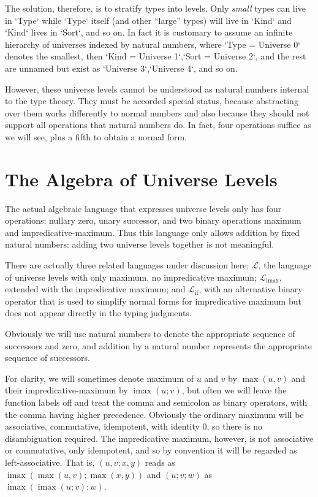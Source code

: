 \documentclass[11pt, twoside, reqno]{book}
\DeclareMathOperator{\imax}{imax}
\DeclareMathOperator{\ifop}{if}
\begin{document}
The solution, therefore, is to stratify types into levels.
Only \emph{small} types can live in \inHS`Type` while \inHS`Type` itself (and other ``large'' types) will live in \inHS`Kind` and \inHS`Kind` lives in \inHS`Sort`, and so on.
In fact it is customary to assume an infinite hierarchy of universes indexed by natural numbers, where \inHS`Type = Universe 0` denotes the smallest, then \inHS`Kind = Universe 1`,\enskip\inHS`Sort = Universe 2`, and the rest are unnamed but exist as \inHS`Universe 3`,\enskip\inHS`Universe 4`, and so on.

However, these universe levels cannot be understood as natural numbers internal to the type theory.
They must be accorded special status, because abstracting over them works differently to normal numbers and also because they should not support all operations that natural numbers do.
In fact, four operations suffice as we will see, plus a fifth to obtain a normal form.

\section{The Algebra of Universe Levels}
\label{alg-uni-lvl}

The actual algebraic language that expresses universe levels only has four operations: nullary zero, unary successor, and two binary operations maximum and impredicative-maximum.
Thus this language only allows addition by fixed natural numbers: adding two universe levels together is not meaningful.

There are actually three related languages under discussion here: \(\mathcal{L}\), the language of universe levels with only maximum, no impredicative maximum; \(\mathcal{L}_{\imax}\), extended with the impredicative maximum; and \(\mathcal{L}_{\ifop}\), with an alternative binary operator that is used to simplify normal forms for impredicative maximum but does not appear directly in the typing judgments.

Obviously we will use natural numbers to denote the appropriate sequence of successors and zero, and addition by a natural number represents the appropriate sequence of successors.

For clarity, we will sometimes denote maximum of \(u\) and \(v\) by \(\max(u, v)\) and their impredicative-maximum by \(\imax(u; v)\), but often we will leave the function labels off and treat the comma and semicolon as binary operators, with the comma having higher precedence.
Obviously the ordinary maximum will be associative, commutative, idempotent, with identity \(0\), so there is no disambiguation required.
The impredicative maximum, however, is not associative or commutative, only idempotent, and so by convention it will be regarded as left-associative.
That is, \((u, v; x, y)\) reads as \(\imax(\max(u, v); \max(x, y))\) and \((u; v; w)\) as \(\imax(\imax(u; v); w)\).
\end{document}
